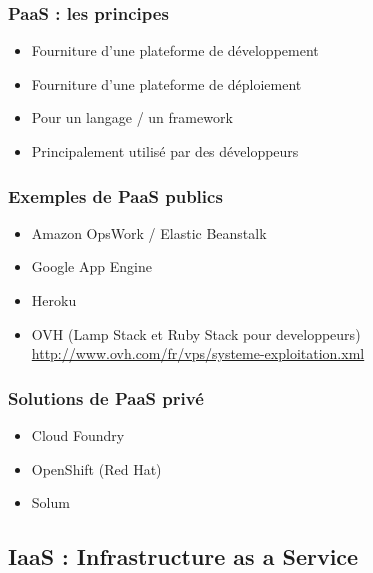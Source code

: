   \begin{frame}
    \frametitle{PaaS : les principes}
    \begin{itemize}
      \item Fourniture d'une plateforme de développement
      \item Fourniture d'une plateforme de déploiement
      \item Pour un langage / un framework
      \item Principalement utilisé par des développeurs
    \end{itemize}
  \end{frame}

  \begin{frame}
    \frametitle{Exemples de PaaS publics}
    \begin{itemize}
      \item Amazon OpsWork / Elastic Beanstalk
      \item Google App Engine
      \item Heroku
      \item OVH (Lamp Stack et Ruby Stack pour developpeurs)\\
      \url{http://www.ovh.com/fr/vps/systeme-exploitation.xml}
    \end{itemize}
  \end{frame}

  \begin{frame}
    \frametitle{Solutions de PaaS privé}
    \begin{itemize}
      \item Cloud Foundry
      \item OpenShift (Red Hat)
      \item Solum
    \end{itemize}
  \end{frame}

  \subsection[IaaS]{IaaS : Infrastructure as a Service}

